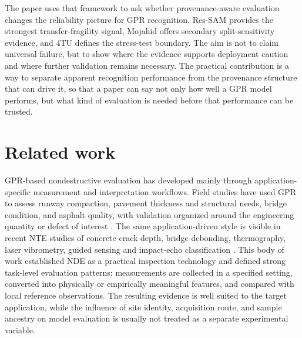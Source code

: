 \documentclass[]{interact}
\begin{document}
The paper uses that framework to ask whether provenance-aware evaluation changes the reliability picture for GPR recognition. Res-SAM provides the strongest transfer-fragility signal, Mojahid offers secondary split-sensitivity evidence, and 4TU defines the stress-test boundary. The aim is not to claim universal failure, but to show where the evidence supports deployment caution and where further validation remains necessary. The practical contribution is a way to separate apparent recognition performance from the provenance structure that can drive it, so that a paper can say not only how well a GPR model performs, but what kind of evaluation is needed before that performance can be trusted.

\section{Related work}
GPR-based nondestructive evaluation has developed mainly through application-specific measurement and interpretation workflows. Field studies have used GPR to assess runway compaction, pavement thickness and structural needs, bridge condition, and asphalt quality, with validation organized around the engineering quantity or defect of interest \cite{cheng2023runway,hu2016pavement,plati2012structural,benedetto2012bridges,poikajarvi2012road}. The same application-driven style is visible in recent NTE studies of concrete crack depth, bridge debonding, thermography, laser vibrometry, guided sensing and impact-echo classification \cite{wang2024tracer,liu2024debonding,ibrahim2024thermography,dong2024vibrometry,cheng2024fusion,qu2024impactecho}. This body of work established NDE as a practical inspection technology and defined strong task-level evaluation patterns: measurements are collected in a specified setting, converted into physically or empirically meaningful features, and compared with local reference observations. The resulting evidence is well suited to the target application, while the influence of site identity, acquisition route, and sample ancestry on model evaluation is usually not treated as a separate experimental variable.
\end{document}
